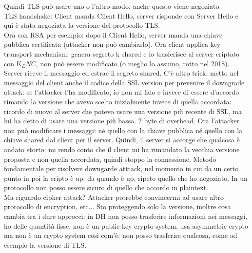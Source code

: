 \documentclass[16px]{article}
\begin{document}
Quindi TLS può usare uno o l'altro modo, anche questo viene negoziato.\\ TLS handshake:
Client manda Client Hello, server risponde con Server Hello e qui è stata negoziata la versione del protocollo TLS.\\ Ora con RSA per esempio: dopo il Client Hello, server manda una chiave pubblica certificata (attacker non può cambiarlo). Ora client applica key transport mechanism: genera segreto k shared e lo trasferisce al server criptato con K$_ENC$,  non può essere modificato (o meglio lo assumo, rotto nel 2018). Server riceve il messaggio ed estrae il segreto shared. C'è altro trick: metto nel messaggio del client anche il codice della SSL version per prevenire il downgrade attack: se l'attacker l'ha modificato, io non mi fido e invece di essere d'accordo rimando la versione che avevo scelto inizialmente invece di quella accordata: ricordo di nuovo al server che potevo usare una versione più recente di SSL, ma lui ha detto di usare una versione più bassa. 2 byte di overhead. Ora l'attacker non può modificare i messaggi: né quello con la chiave pubblica né quello con la chiave shared dal client per il server. Quindi, il server si accorge che qualcosa è andato storto: mi rendo conto che il client mi ha rimandato la vecchia versione proposta e non quella accordata, quindi stoppo la connessione. Metodo fondamentale per risolvere downgarde atttack, nel momento in cui da un certo punto in poi la cripto è up: da quando è up, ripeto quello che ho negoziato. In un protocollo non posso essere sicuro di quello che accordo in plaintext.\\ Ma riguardo cipher attack? Attacker potrebbe convincermi ad usare altro protocollo di encryption, etc... Sto proteggendo solo la versione, inoltre cosa cambia tra i dure approcci: in DH non posso trasferire informazioni nei messaggi, ho delle quantità fisse, non è un public key crypto system, usa asymmetric crypto ma non è un crypto system così com'è: non posso trasferire qualcosa, come ad esempio la versione di TLS.
\end{document}
